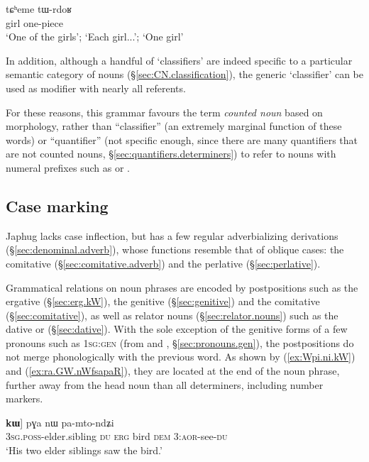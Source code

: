 \begin{exe}
\ex \label{ex:tCheme.tWrdoR}
\gll tɕʰeme tɯ-rdoʁ \\
girl one-piece \\
\glt `One of the girls'; `Each girl...'; `One girl' 
\end{exe}

In addition, although a handful of  `classifiers' are indeed specific to a particular semantic category of nouns (§\ref{sec:CN.classification}), the generic `classifier'  can be used as modifier with nearly all referents.

For these reasons, this grammar favours the term \textit{counted noun} based on morphology, rather than ``classifier'' (an extremely marginal function of these words) or ``quantifier'' (not specific enough, since there are many quantifiers that are not counted nouns, §\ref{sec:quantifiers.determiners}) to refer to nouns with numeral prefixes such as  or .

\subsection{Case marking} \label{sec:case.intro}
Japhug lacks case inflection, but has a few regular adverbializing derivations (§\ref{sec:denominal.adverb}), whose functions resemble that of oblique cases: the comitative  (§\ref{sec:comitative.adverb}) and the perlative (§\ref{sec:perlative}).

Grammatical relations on noun phrases are encoded by postpositions such as the ergative  (§\ref{sec:erg.kW}), the genitive  (§\ref{sec:genitive}) and the comitative  (§\ref{sec:comitative}), as well as relator nouns (§\ref{sec:relator.nouns}) such as the dative  or  (§\ref{sec:dative}). With the sole exception of the genitive forms of a few pronouns such as  \textsc{1sg}:\textsc{gen} (from  and , §\ref{sec:pronouns.gen}), the postpositions do not merge phonologically with the previous word. As shown by (\ref{ex:Wpi.ni.kW}) and (\ref{ex:ra.GW.nWfsapaR}), they are located at the end of the noun phrase, further away from the head noun than all determiners, including number markers. 

\begin{exe}
\ex \label{ex:Wpi.ni.kW}
\gll [[ɯ-pi ni] \textbf{kɯ}] pɣa nɯ pa-mto-ndʑi\\
\textsc{3sg}.\textsc{poss}-elder.sibling \textsc{du} \textsc{erg} bird \textsc{dem} 3\flobv{}:\textsc{aor}-see-\textsc{du} \\
\glt `His two elder siblings saw the bird.' 
\end{exe}

